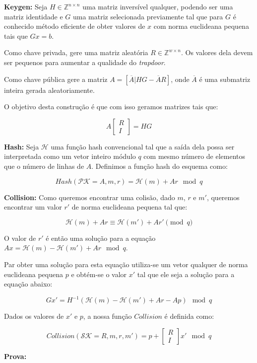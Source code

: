 \documentclass[a4paper]{article}
\begin{document}
\textbf{Keygen:} Seja $H \in \mathbb{Z}^{n\times n}$ uma matriz
inversível qualquer, podendo ser uma matriz identidade e $G$ uma
matriz selecionada previamente tal que para $G$ é conhecido método
eficiente de obter valores de $x$ com norma euclideana pequena tais
que $Gx = b$.

Como chave privada, gere uma matriz aleatória $R \in \mathbb{Z}^{w
  \times n}$. Os valores dela devem ser pequenos para aumentar a
qualidade do \textit{trapdoor}.

Como chave pública gere a matriz $A=[\overline{A}|HG-\overline{A}R]$,
onde $\overline{A}$ é uma submatriz inteira gerada aleatoriamente.

O objetivo desta construção é que com isso geramos matrizes tais que:

$$
A\left[\begin{matrix}R\\I\end{matrix}\right] = HG
$$

\textbf{Hash: } Seja $\mathcal{H}$ uma função hash convencional tal
que a saída dela possa ser interpretada como um vetor inteiro módulo
$q$ com mesmo número de elementos que o número de linhas de
$A$. Definimos a função hash do esquema como:

$$
Hash(\mathcal{PK}=A, m, r) = \mathcal{H}(m) + Ar \mod q
$$

\textbf{Collision: } Como queremos encontrar uma colisão, dado $m$,
$r$ e $m'$, queremos encontrar um valor $r'$ de norma euclideana
pequena tal que:

$$
\mathcal{H}(m) + Ar  \equiv \mathcal{H}(m') + Ar' \pmod q
$$

O valor de $r'$ é então uma solução para a equação $Ax =
\mathcal{H}(m) - \mathcal{H}(m') + Ar \mod q$.

Par obter uma solução para esta equação utiliza-se um vetor qualquer
de norma euclideana pequena $p$ e obtém-se o valor $x'$ tal que ele
seja a solução para a equação abaixo:

$$
Gx' = H^{-1}(\mathcal{H}(m) - \mathcal{H}(m') + Ar - Ap) \mod q
$$

Dados os valores de $x'$ e $p$, a nossa função $Collision$ é definida
como:

$$ Collision(\mathcal{SK}=R, m, r, m') = p +
\left[\begin{matrix}R\\I\end{matrix}\right]x' \mod q
$$

\textbf{Prova:}
\end{document}
